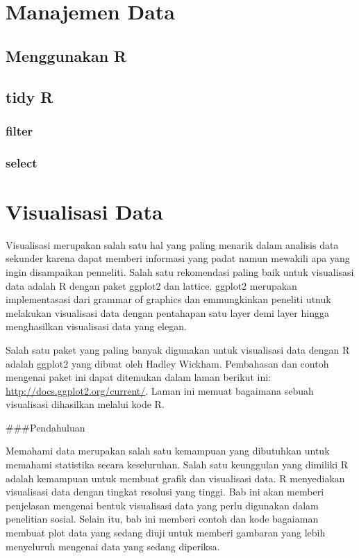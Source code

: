 \documentclass[
]{book}
\begin{document}
\hypertarget{manajemen-data-1}{%
\chapter{Manajemen Data}\label{manajemen-data-1}}

\hypertarget{menggunakan-r}{%
\section{Menggunakan R}\label{menggunakan-r}}

\hypertarget{tidy-r}{%
\section{tidy R}\label{tidy-r}}

\hypertarget{filter}{%
\subsection{filter}\label{filter}}

\hypertarget{select}{%
\subsection{select}\label{select}}

\hypertarget{visualisasi-data}{%
\chapter{Visualisasi Data}\label{visualisasi-data}}

Visualisasi merupakan salah satu hal yang paling menarik dalam analisis data sekunder karena dapat memberi informasi yang padat namun mewakili apa yang ingin disampaikan penneliti. Salah satu rekomendasi paling baik untuk visualisasi data adalah R dengan paket ggplot2 dan lattice. ggplot2 merupakan implementasasi dari grammar of graphics dan emmungkinkan peneliti utnuk melakukan visualisasi data dengan pentahapan satu layer demi layer hingga menghasilkan visualisasi data yang elegan.

Salah satu paket yang paling banyak digunakan untuk visualisasi data dengan R adalah ggplot2 yang dibuat oleh Hadley Wickham. Pembahasan dan contoh mengenai paket ini dapat ditemukan dalam laman berikut ini: \url{http://docs.ggplot2.org/current/}. Laman ini memuat bagaimana sebuah visualisasi dihasilkan melalui kode R.

\#\#\#Pendahuluan

Memahami data merupakan salah satu kemampuan yang dibutuhkan untuk memahami statistika secara keseluruhan. Salah satu keunggulan yang dimiliki R adalah kemampuan untuk membuat grafik dan visualisasi data. R menyediakan visualisasi data dengan tingkat resolusi yang tinggi. Bab ini akan memberi penjelasan mengenai bentuk visualisasi data yang perlu digunakan dalam penelitian sosial. Selain itu, bab ini memberi contoh dan kode bagaiaman membuat plot data yang sedang diuji untuk memberi gambaran yang lebih menyeluruh mengenai data yang sedang diperiksa.
\end{document}
